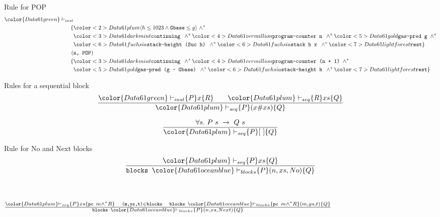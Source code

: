 \documentclass{beamer}
\begin{document}
\setbeamercovered{}
\begin{frame}{Rule for POP}
	\begin{align*}
		{\color{Data61 green}\vdash_{inst}}&\\
		\{&{\color<2>{Data61 plum}\langle h \leq 1023 \wedge \texttt{Gbase} \leq g \rangle}~ \wedge^*\\
		&{\color<3>{Data61 dark mint}\texttt{continuing }} \wedge^*
		{\color<4>{Data61 vermillion}\texttt{program-counter n }} \wedge^*
		{\color<5>{Data61 gold}\texttt{gas-pred g }} \wedge^*\\
		&{\color<6>{Data61 fuchsia}\texttt{stack-height (Suc h) }} \wedge^*
		{\color<6>{Data61 fuchsia}\texttt{stack h x }} \wedge^*
		{\color<7>{Data61 light forest}\texttt{rest}}
		\}\\
		(&\texttt{n, POP}) \\
		\{&{\color<3>{Data61 dark mint}\texttt{continuing }} \wedge^*
		{\color<4>{Data61 vermillion}\texttt{program-counter (n + 1) }} \wedge^*\\
		&{\color<5>{Data61 gold}\texttt{gas-pred (g - Gbase) }} \wedge^*
		{\color<6>{Data61 fuchsia}\texttt{stack-height h }} \wedge^*
		{\color<7>{Data61 light forest}\texttt{rest}}\}
	\end{align*}
\end{frame}

\begin{frame}{Rules for a sequential block}
	\[\frac{{\color{Data61 green}\vdash_{inst}} \{P\} x \{R\}
		\qquad {\color{Data61 plum}\vdash_{seq}} \{R\} xs \{Q\}}
	{{\color{Data61 plum}\vdash_{seq}} \{P\} (x\#xs) \{Q\}}\]

	\[\frac{\forall s.~P~s~\rightarrow~Q~s}
	{{\color{Data61 plum}\vdash_{seq}} \{P\} [~] \{Q\}}\]
\end{frame}

\begin{frame}{Rule for No and Next blocks}
	\[\frac{{\color{Data61 plum}\vdash_{seq}} \{P\} xs \{Q\}}
	{\texttt{blocks~}{\color{Data61 ocean blue}\vdash_{blocks}} \{P\} (n,xs,No) \{Q\}}\]

	~\\~\\
	\centering
	$\frac{{\color{Data61 plum}\vdash_{seq}} \{P\} xs \{\texttt{pc } m \wedge^* R\}
		\quad \texttt{(m,ys,t)}\in \texttt{blocks}
		\quad \texttt{blocks~}{\color{Data61 ocean blue}\vdash_{blocks}} \{\texttt{pc } m \wedge^* R\} (m,ys,t) \{Q\}}
	{\texttt{blocks~}{\color{Data61 ocean blue}\vdash_{blocks}} \{P\} (n,xs,Next) \{Q\}}$
\end{frame}
\end{document}
